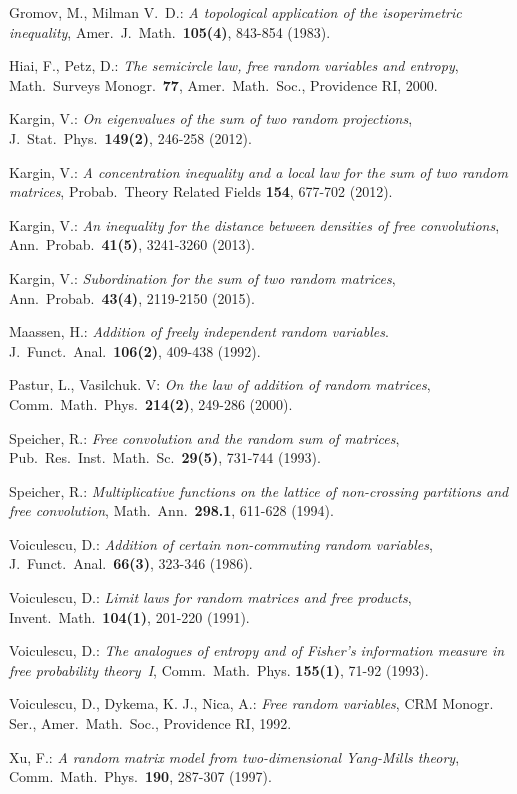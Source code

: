 \documentclass[10pt,reqno]{amsart}
\numberwithin{equation}{section}
\theoremstyle{plain}
\numberwithin{kevin}{section}
\theoremstyle{remark}
\begin{document}
\begin{thebibliography}{00}
 Gromov, M., Milman V.\ D.: \emph{A topological application of the isoperimetric inequality}, Amer.\ J.\ Math.\ \textbf{105(4)}, 843-854 (1983).

 Hiai, F.,  Petz, D.: \emph{The semicircle law, free random variables and entropy}, Math.\ Surveys Monogr.\ \textbf{77},  Amer.\ Math.\ Soc., Providence RI,  2000.
 
 Kargin, V.: \emph{On eigenvalues of the sum of two random projections}, J.\ Stat.\ Phys.\ \textbf{149(2)}, 246-258 (2012).

 Kargin, V.: \emph{A concentration inequality and a local law for the sum of two random matrices}, Probab.\ Theory Related Fields \textbf{154}, 677-702 (2012).
 
 Kargin, V.: \emph{An inequality for the distance between densities of free convolutions},  Ann.\ Probab.\ \textbf{41(5)}, 3241-3260 (2013).

 Kargin, V.: \emph{Subordination for the sum of two random matrices}, Ann.\ Probab.\ \textbf{43(4)}, 2119-2150 (2015).

 Maassen, H.: \emph{Addition of freely independent random variables}. J.\ Funct.\ Anal.\ \textbf{106(2)}, 409-438 (1992). 

Pastur, L., Vasilchuk. V: \emph{On the law of addition of random matrices}, Comm.\ Math.\ Phys.\ \textbf{214(2)}, 249-286 (2000).

 Speicher, R.: \emph{Free convolution and the random sum of matrices}, Pub.\ Res.\ Inst.\ Math.\  Sc.\ \textbf{29(5)}, 731-744 (1993).

 Speicher, R.: \emph{Multiplicative functions on the lattice of non-crossing partitions and free convolution}, Math.\ Ann.\ \textbf{298.1}, 611-628 (1994).
  
 Voiculescu, D.: \emph{Addition of certain non-commuting random variables}, J.\ Funct.\ Anal.\ \textbf{66(3)}, 323-346 (1986).

 Voiculescu, D.: \emph{Limit laws for random matrices and free products}, Invent.\ Math.\ \textbf{104(1)}, 201-220 (1991).

 Voiculescu, D.: \emph{The analogues of entropy and of Fisher's information measure in free probability theory~I}, Comm.\ Math.\ Phys. \textbf{155(1)}, 71-92 (1993). 

 Voiculescu, D., Dykema, K. J., Nica, A.: \emph{Free random variables}, CRM Monogr. Ser.,  Amer.\ Math.\ Soc., Providence RI, 1992.

 Xu, F.: \emph{A random matrix model from two-dimensional Yang-Mills theory}, Comm.\
Math.\ Phys.\  \textbf{190}, 287-307 (1997).
\end{thebibliography}
\end{document}
